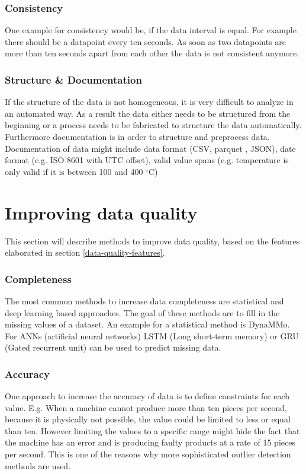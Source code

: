 \subsubsection{Consistency}
One example for consistency would be, if the data interval is equal. For example there should be a datapoint every ten seconds. As soon as two datapoints are more than ten seconds apart from each other the data is not consistent anymore. \cite{caiChallengesDataQuality2015}
\subsubsection{Structure \& Documentation}
If the structure of the data is not homogeneous, it is very difficult to analyze in an automated way. As a result the data either needs to be structured from the beginning or a process needs to be fabricated to structure the data automatically. Furthermore documentation is in order to structure and preprocess data. Documentation of data might include data format (CSV, parquet \cite{ApacheParquet2021}, JSON), date format (e.g. ISO 8601 with UTC offset), valid value spans (e.g. temperature is only valid if it is between 100 and 400 $^{\circ}$C)
\cite{caiChallengesDataQuality2015}

\section{Improving data quality}
This section will describe methods to improve data quality, based on the features elaborated in section \ref{data-quality-features}.
\subsubsection{Completeness}
The most common methods to increase data completeness are statistical and deep learning based approaches. The goal of these methods are to fill in the missing values of a dataset. An example for a statistical method is DynaMMo\cite{liDynaMMoMiningSummarization2009}. For ANNs (artificial neural networks) LSTM (Long short-term memory) or GRU (Gated recurrent unit) can be used to predict missing data. \cite{songIoTDataQuality2020}
\subsubsection{Accuracy}
One approach to increase the accuracy of data is to define constraints for each value. E.g. When a machine cannot produce more than ten pieces per second, because it is physically not possible, the value could be limited to less or equal than ten. However limiting the values to a specific range might hide the fact that the machine  has an error and is producing faulty products at a rate of 15 pieces per second. This is one of the reasons why more sophisticated outlier detection methods are used.\cite{songIoTDataQuality2020}

